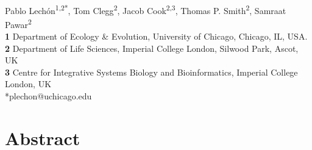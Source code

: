 \documentclass[10pt,letterpaper]{article}
\begin{document}
\vspace*{0.2in}

\begin{flushleft}
{\Large
\textbf{}
}
\newline
\\
Pablo Lechón\textsuperscript{1,2*},
Tom Clegg\textsuperscript{2},
Jacob Cook\textsuperscript{2,3},
Thomas P. Smith\textsuperscript{2},
Samraat Pawar\textsuperscript{2}
\\
\bigskip
\textbf{1} Department of Ecology \& Evolution, University of Chicago, Chicago, IL, USA.
\\
\textbf{2} Department of Life Sciences, Imperial College London, Silwood Park, Ascot, UK
\\
\textbf{3} Centre for Integrative Systems Biology and Bioinformatics, Imperial College London, UK
\\
\bigskip
*plechon@uchicago.edu 

\end{flushleft}

\section*{Abstract}
\end{document}
